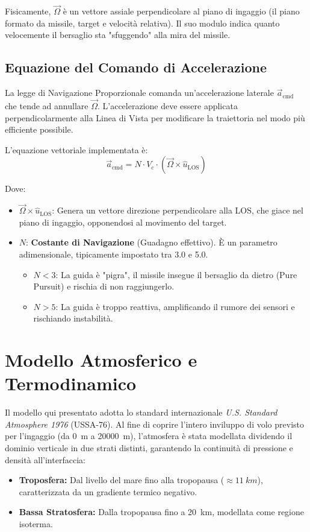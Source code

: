 \documentclass[12pt,a4paper]{article}
\begin{document}
Fisicamente, $\vec{\Omega}$ è un vettore assiale perpendicolare al piano di ingaggio (il piano formato da missile, target e velocità relativa). Il suo modulo indica quanto velocemente il bersaglio sta "sfuggendo" alla mira del missile.

\subsection{Equazione del Comando di Accelerazione}
La legge di Navigazione Proporzionale comanda un'accelerazione laterale $\vec{a}_{\text{cmd}}$ che tende ad annullare $\vec{\Omega}$. L'accelerazione deve essere applicata perpendicolarmente alla Linea di Vista per modificare la traiettoria nel modo più efficiente possibile.

L'equazione vettoriale implementata è:
\begin{equation}
    \vec{a}_{\text{cmd}} = N \cdot V_c \cdot (\vec{\Omega} \times \hat{u}_{\text{LOS}})
\end{equation}

Dove:
\begin{itemize}
    \item $\vec{\Omega} \times \hat{u}_{\text{LOS}}$: Genera un vettore direzione perpendicolare alla LOS, che giace nel piano di ingaggio, opponendosi al movimento del target.
    \item $N$: \textbf{Costante di Navigazione} (Guadagno effettivo). È un parametro adimensionale, tipicamente impostato tra 3.0 e 5.0.
    \begin{itemize}
        \item $N < 3$: La guida è "pigra", il missile insegue il bersaglio da dietro (Pure Pursuit) e rischia di non raggiungerlo.
        \item $N > 5$: La guida è troppo reattiva, amplificando il rumore dei sensori e rischiando instabilità.
    \end{itemize}
\end{itemize}

\section{Modello Atmosferico e Termodinamico}
Il modello qui presentato adotta lo standard internazionale \textit{U.S. Standard Atmosphere 1976} (USSA-76). Al fine di coprire l'intero inviluppo di volo previsto per l'ingaggio (da \SI{0}{m} a \SI{20000}{m}), l'atmosfera è stata modellata dividendo il dominio verticale in due strati distinti, garantendo la continuità di pressione e densità all'interfaccia:
\begin{itemize}
    \item \textbf{Troposfera:} Dal livello del mare fino alla tropopausa ($\approx \SI{11}{km}$), caratterizzata da un gradiente termico negativo.
    \item \textbf{Bassa Stratosfera:} Dalla tropopausa fino a \SI{20}{km}, modellata come regione isoterma.
\end{itemize}
\end{document}
